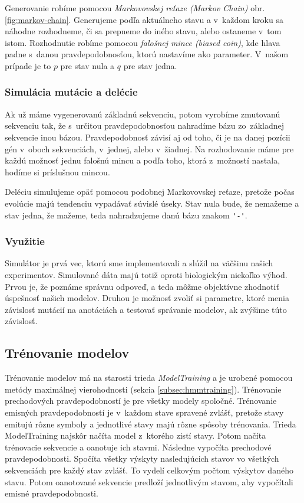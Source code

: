 Generovanie robíme pomocou \textit{Markovovskej reťaze (Markov Chain)} obr. \ref{fig:markov-chain}. Generujeme podľa aktuálneho stavu a v~každom kroku sa náhodne rozhodneme, či sa prepneme do iného stavu, alebo ostaneme v~tom istom. Rozhodnutie robíme pomocou \textit{falošnej mince (biased coin)}, kde hlava padne s~danou pravdepodobnosťou, ktorú nastavíme ako parameter. V~našom prípade je to $p$ pre stav nula a $q$ pre stav jedna.


\subsubsection{Simulácia mutácie a delécie}

Ak už máme vygenerovanú základnú sekvenciu, potom vyrobíme zmutovanú sekvenciu tak, že s~určitou pravdepodobnosťou nahradíme bázu zo~základnej sekvencie inou bázou. Pravdepodobnosť závisí aj od toho, či je na danej pozícii gén v~oboch sekvenciách, v~jednej, alebo v~žiadnej. Na rozhodovanie máme pre každú možnosť jednu falošnú mincu a podľa toho, ktorá z~možností nastala, hodíme si príslušnou mincou.

Deléciu simulujeme opäť pomocou podobnej Markovovskej reťaze, pretože počas evolúcie majú tendenciu vypadávať súvislé úseky. Stav nula bude, že nemažeme a stav jedna, že mažeme, teda nahradzujeme danú bázu znakom {\verb+'-'+}.

\subsubsection{Využitie}

Simulátor je prvá vec, ktorú sme implementovali a slúžil na väčšinu našich experimentov. Simulované dáta majú totiž oproti biologickým niekoľko výhod. Prvou je, že poznáme správnu odpoveď, a teda môžme objektívne zhodnotiť úspešnosť našich modelov. Druhou je možnosť zvoliť si parametre, ktoré menia závislosť mutácií na anotáciách a testovať správanie modelov, ak zvýšime túto závislosť.

\subsection{Trénovanie modelov}
\label{subsec:impl-model-traioning}

Trénovanie modelov má na starosti trieda \textit{ModelTraining} a je urobené pomocou metódy maximálnej vierohodnosti (sekcia \ref{subsec:hmmtraining}).
Trénovanie prechodových pravdepodobností je pre všetky modely spoločné. Trénovanie emisných pravdepodobností je v~každom stave spravené zvlášť, pretože stavy emitujú rôzne symboly a jednotlivé stavy majú rôzne spôsoby trénovania.
Trieda ModelTraining najskôr načíta model z~ktorého zistí stavy.
Potom načíta trénovacie sekvencie a oanotuje ich stavmi. Následne vypočíta prechodové pravdepodobnosti. Spočíta všetky výskyty nasledujúcich stavov vo všetkých sekvenciách pre každý stav zvlášť. To vydelí celkovým počtom výskytov daného stavu. Potom oanotované sekvencie predloží jednotlivým stavom, aby vypočítali emisné pravdepodobnosti.

